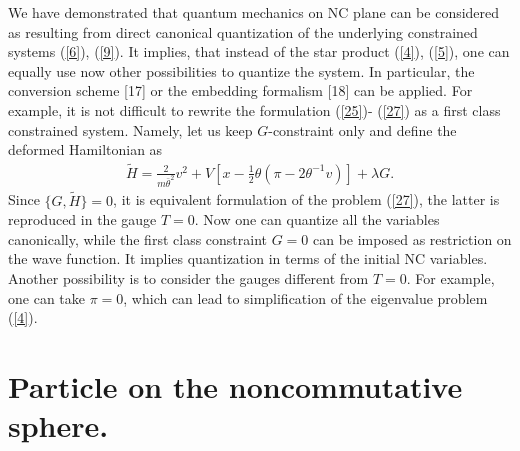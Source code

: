 \documentclass[paper a4]{article}
\begin{document}
We have demonstrated that quantum mechanics on NC plane
can be considered as resulting from direct canonical
quantization of the underlying constrained systems (\ref{6}), (\ref{9}).
It implies, that
instead of the star product (\ref{4}), (\ref{5}), one can equally use now
other possibilities to quantize the system. In particular, the
conversion scheme [17] or the embedding formalism [18] can be applied.
For example, it is not difficult to rewrite the formulation (\ref{25})-
(\ref{27}) as a first class constrained system. Namely, let us keep
$G$-constraint only and define the deformed Hamiltonian as
\begin{eqnarray}\label{30}
\tilde H=\frac{2}{m\bar\theta^2}v^2+V[x-\frac{1}{2}\theta
(\pi-2\theta^{-1}v)]+\lambda G.
\end{eqnarray}
Since $\{G, \tilde H\}=0$, it is equivalent formulation of the problem
(\ref{27}), the latter is reproduced in the gauge $T=0$. Now one can
quantize all the variables canonically, while the first class constraint
$G=0$ can be imposed as restriction on the wave function. It implies
quantization in terms of the initial NC variables.
Another possibility is to consider the gauges different from $T=0$.
For example, one can take $\pi=0$, which can lead to simplification
of the eigenvalue problem (\ref{4}).

\section{Particle on the noncommutative sphere.}
\end{document}
